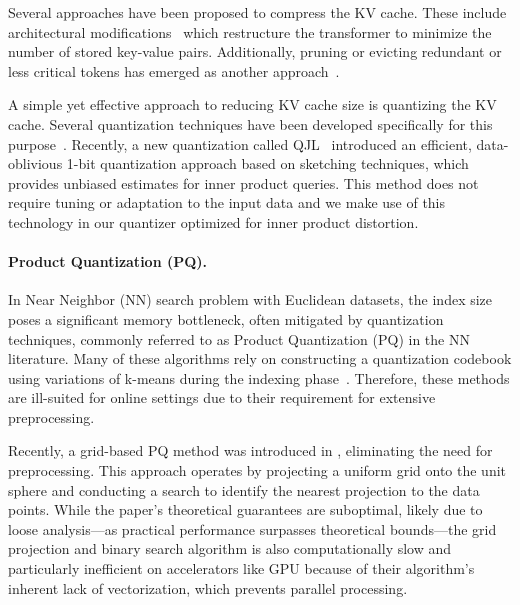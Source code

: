\documentclass[11pt]{article}
\begin{document}
Several approaches have been proposed to compress the KV cache.
These include architectural modifications~\cite{shazeer2019fast, ainslie2023gqa, dai2024deepseekmoe} which restructure the transformer to minimize the number of stored key-value pairs.
Additionally, pruning or evicting redundant or less critical tokens has emerged as another approach~\cite{beltagy2020longformer, zhang2024h2o, liu2024scissorhands, xiao2023efficient, zandieh2024subgen, li2024snapkv, han2025balancekv}.

A simple yet effective approach to reducing KV cache size is quantizing the KV cache. 
Several quantization techniques have been developed specifically for this purpose~\cite{yue2024wkvquant, yang2024no, dong2024qaq, kang2024gear, zhang2024kv, liu2024kivi, hooper2024kvquant, kim2024lexico, han2025polarquant}.
Recently, a new quantization called QJL~\cite{qjl} introduced an efficient, data-oblivious 1-bit quantization approach based on sketching techniques, which provides unbiased estimates for inner product queries.
This method does not require tuning or adaptation to the input data and we make use of this technology in our quantizer optimized for inner product distortion.

\paragraph{Product Quantization (PQ).}
In Near Neighbor (NN) search problem with Euclidean datasets, the index size poses a significant memory bottleneck, often mitigated by quantization techniques, commonly referred to as Product Quantization (PQ) in the NN literature.
Many of these algorithms rely on constructing a quantization codebook using variations of k-means during the indexing phase~\cite{jegou2010product, babenko2014additive, ge2013optimized, wang2017survey, guo2020accelerating}. 
Therefore, these methods are ill-suited for online settings due to their requirement for extensive preprocessing.

Recently, a grid-based PQ method was introduced in \cite{gao2024practical}, eliminating the need for preprocessing. 
This approach operates by projecting a uniform grid onto the unit sphere and conducting a search to identify the nearest projection to the data points. 
While the paper's theoretical guarantees are suboptimal, likely due to loose analysis—as practical performance surpasses theoretical bounds—the grid projection and binary search algorithm is also computationally slow and particularly inefficient on accelerators like GPU because of their algorithm's inherent lack of vectorization, which prevents parallel processing.
\end{document}
